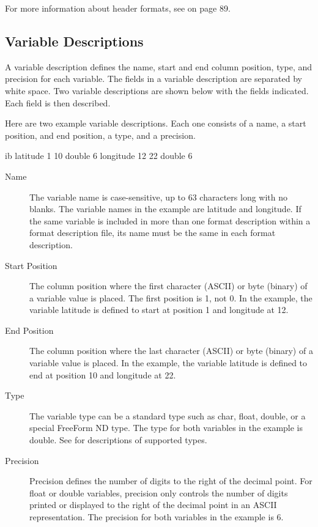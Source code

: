 For more information about header formats, see 
on page 89.





\subsection{Variable Descriptions}
\label{ff,tblfmt,var}

A variable description defines the name, start and end column
position, type, and precision for each variable. The fields in a
variable description are separated by white space. Two variable
descriptions are shown below with the fields indicated. Each field is
then described.

Here are two example variable descriptions.  Each one consists of a
name, a start position, and end position, a type, and a precision.

\begin{vcode}{ib}
latitude    1  10  double  6
longitude  12  22  double  6
\end{vcode}

\begin{description}
\item[Name]
  
  The variable name is case-sensitive, up to 63 characters long with
  no blanks. The variable names in the example are latitude and
  longitude. If the same variable is included in more than one format
  description within a format description file, its name must be the
  same in each format description.

\item[Start Position]
  
  The column position where the first character (ASCII) or byte
  (binary) of a variable value is placed. The first position is 1, not
  0. In the example, the variable latitude is defined to start at
  position 1 and longitude at 12.

\item[End Position]
  
  The column position where the last character (ASCII) or byte
  (binary) of a variable value is placed. In the example, the variable
  latitude is defined to end at position 10 and longitude at 22.

\item[Type]
  
  The variable type can be a standard type such as char, float,
  double, or a special FreeForm ND type. The type for both variables
  in the example is double. See  for
  descriptions of supported types.

\item[Precision]
  
  Precision defines the number of digits to the right of the decimal
  point. For float or double variables, precision only controls the
  number of digits printed or displayed to the right of the decimal
  point in an ASCII representation. The precision for both variables
  in the example is 6.
\end{description}


